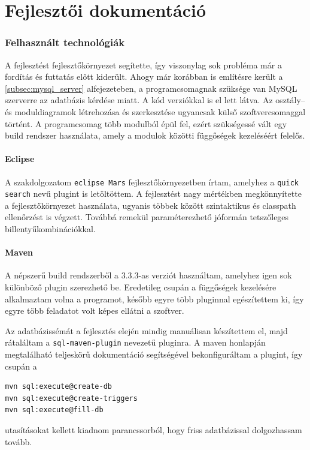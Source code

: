 \part{Fejlesztői dokumentáció}


\section{Felhasznált technológiák}
A fejlesztést fejlesztőkörnyezet segítette, így viszonylag sok probléma már a fordítás és futtatás előtt kiderült. Ahogy már korábban is említésre került a \ref{subsec:mysql_server} alfejezeteben, a programcsomagnak szüksége van MySQL szerverre az adatbázis kérdése miatt. A kód verziókkal is el lett látva. Az osztály-- és moduldiagramok létrehozása és szerkesztése ugyancsak külső szoftvercsomaggal történt. A programcsomag több modulból épül fel, ezért szükségessé vált egy build rendszer használata, amely a modulok közötti függőségek kezeléséért felelős.

\subsection{Eclipse}
A szakdolgozatom \texttt{eclipse Mars} \cite{eclipse_mars} fejlesztőkörnyezetben írtam, amelyhez a \texttt{quick search} \cite{quick_search} nevű plugint is letöltöttem. A fejlesztést nagy mértékben megkönnyítette a fejlesztőkörnyezet használata, ugyanis többek között szintaktikus és classpath ellenőrzést is végzett. Továbbá remekül paraméterezhető jóformán tetszőleges billentyűkombinációkkal.

\subsection{Maven}
A népszerű build rendszerből a 3.3.3-as verziót használtam, amelyhez igen sok különböző plugin szerezhető be. Eredetileg csupán a függőségek kezelésére alkalmaztam volna a programot, később egyre több pluginnal egészítettem ki, így egyre több feladatot volt képes ellátni a szoftver.

Az adatbázissémát a fejlesztés elején mindig manuálisan készítettem el, majd rátaláltam a \texttt{sql-maven-plugin} nevezetű pluginra. A maven honlapján megtalálható teljeskörű dokumentáció segítségével bekonfiguráltam a plugint, így csupán a
 \begin{Verbatim}[xleftmargin=.5in]
mvn sql:execute@create-db
mvn sql:execute@create-triggers
mvn sql:execute@fill-db
\end{Verbatim}
utasításokat kellett kiadnom parancssorból, hogy friss adatbázissal dolgozhassam tovább. 

